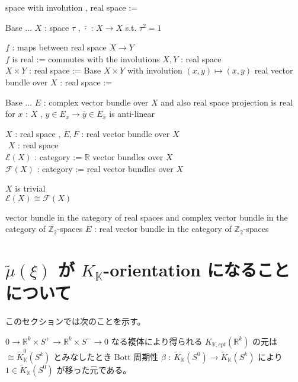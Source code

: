 \documentclass[dvipdfmx]{jsarticle}
\begin{document}
\begin{Definition}
\itemdefi
  \Define space with involution , real space :=
  \begin{itemize}
    \itemenum Base \(\ldots\) \(X\) : space
    \itemenum \(\tau\) , \(\bar{\cdot}\) : \(X \to X\) s.t. \(\tau^2 = 1\)
  \end{itemize}
\itemdefi
  \For \(f\) : maps between real space \(X \to Y\) \\
  \Define \(f\) is real := commutes with the involutions
\itemdefi
  \For \(X,Y\) : real space \\
  \Define \(X \times Y\) : real space := Base \(X \times Y\) with involution \((x,y) \mapsto (\bar{x}, \bar{y})\)
\itemdefi
  \Define real vector bundle over \(X\) : real space :=
  \begin{itemize}
    \itemenum Base \(\ldots\) \(E\) : complex vector bundle over \(X\) and also real space
    \itemwith projection is real
    \itemwith for \(x\) : \(X\) , \(y \in E_{x} \to \bar{y} \in E_{\bar{x}}\) is anti-linear
  \end{itemize}
\itemdefi
  \For \(X\) : real space , \(E,F\) : real vector bundle over \(X\) \\
  \Define \(\)
\itemdefi
  \For \(X\) : real space \\
  \Define \(\mathscr{E}(X)\) : category := \(\mathbb{R}\) vector bundles over \(X\) \\
  \Define \(\mathscr{F}(X)\) : category := real vector bundles over \(X\)
\end{Definition}

\begin{Theorem}
\itemprop
  \IfHold \(X\) is trivial \\
  \Then \(\mathscr{E}(X) \cong \mathscr{F}(X)\)
\item 
\end{Theorem}

\begin{Theorem}
\itemprop
  \Then vector bundle in the category of real spaces and complex vector bundle in the category of \(\mathbb{Z}_2\)-spaces
\itemprop
  \For \(E\) : real vector bundle in the category of \(\mathbb{Z}_2\)-spaces \\
  \Then 
\end{Theorem}

\section*{\(\tilde{\mu}(\xi)\) が \(K_{\mathbb{K}}\)-orientation になることについて}
このセクションでは次のことを示す。
\begin{Theorem}
\itemprop
  \(0 \to \mathbb{R}^k \times S^+ \to \mathbb{R}^k \times S^- \to 0\) なる複体により得られる \(K_{\mathbb{K},cpt}(\mathbb{R}^k)\) の元は \(\cong \tilde{K}_{\mathbb{K}}^0(S^k)\) とみなしたとき Bott 周期性 \(\beta\) : \(\tilde{K}_{\mathbb{K}}(S^0) \to \tilde{K}_{\mathbb{K}}(S^k)\) により \(1 \in \tilde{K}_{\mathbb{K}}(S^0)\) が移った元である。
\end{Theorem}
\end{document}
